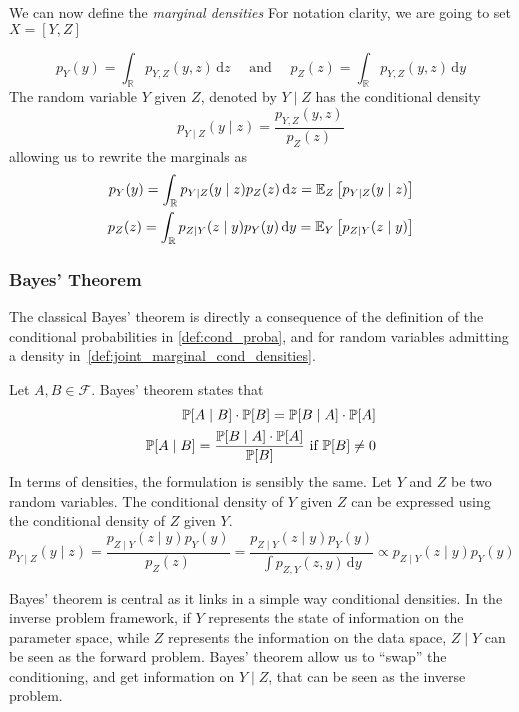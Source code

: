 \documentclass[../../Main_ManuscritThese.tex]{subfiles}
\begin{document}
\begin{definition}
  We can now define the \emph{marginal densities}
  For notation clarity, we are going to set $X = [Y,Z]$

  \begin{equation}
    \label{eq:marginals_def}
    p_{Y}(y) = \int_{\mathbb{R}}p_{Y,Z}(y,z) \,\mathrm{d}z \quad \text{ and } \quad p_{Z}(z) = \int_{\mathbb{R}}p_{Y,Z}(y,z) \,\mathrm{d}y
  \end{equation}
  The random variable $Y$ given $Z$, denoted by $Y \mid Z$ has the conditional density
  \begin{equation}
    p_{Y \mid Z}(y \mid z) = \frac{p_{Y,Z}(y,z)}{p_Z(z)}
  \end{equation}
  allowing us to rewrite the marginals as
  \begin{align}
    \label{eq:marginal_conditioned}
        p_{Y}(y) = \int_{\mathbb{R}}p_{Y\mid Z}(y\mid z)p_Z(z) \,\mathrm{d}z=\mathbb{E}_Z\left[p_{Y\mid Z}(y\mid z)\right] \\ p_{Z}(z) = \int_{\mathbb{R}}p_{Z\mid Y}(z\mid y)p_Y(y) \,\mathrm{d}y = \mathbb{E}_{Y}\left[p_{Z\mid Y}(z\mid y)\right]
  \end{align}

\end{definition}

\subsubsection{Bayes' Theorem}
\label{ssec:bayes_theorem}

The classical Bayes' theorem is directly a consequence of the definition of the conditional probabilities in \cref{def:cond_proba}, and for random variables admitting a density in~\cref{def:joint_marginal_cond_densities}.

\begin{theorem}
  Let $A, B\in\mathcal{F}$. Bayes' theorem states that
  \begin{align*}
    \mathbb{P}[A\mid B]\cdot \mathbb{P}[B] = \mathbb{P}[B \mid A]\cdot\mathbb{P}[A] \\
    \mathbb{P}[A \mid B] = \frac{\mathbb{P}[B \mid A]\cdot\mathbb{P}[A]}{\mathbb{P}[B]} \text{ if } \mathbb{P}[B] \neq 0
  \end{align*}
 In terms of densities, the formulation is sensibly the same.
  Let $Y$ and $Z$ be two random variables. The conditional density of $Y$ given $Z$ can be expressed using the conditional density of $Z$ given $Y$.
  \begin{equation}
    p_{Y\mid Z}(y \mid z) = \frac{p_{Z\mid Y}(z\mid y) p_Y(y)}{p_Z(z)} = \frac{p_{Z\mid Y}(z\mid y) p_Y(y)}{\int p_{Z,Y}(z,y) \,\mathrm{d}y}  \propto p_{Z\mid Y}(z\mid y) p_Y(y)
  \end{equation}
\end{theorem}
Bayes' theorem is central as it links in a simple way conditional densities. In the inverse problem framework, if $Y$ represents the state of information on the parameter space, while $Z$ represents the information on the data space, $Z\mid Y$ can be seen as the forward problem. Bayes' theorem allow us to ``swap'' the conditioning, and get information on $Y\mid Z$, that can be seen as the inverse problem.
\end{document}
